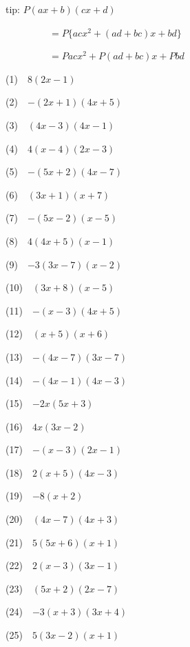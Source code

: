 \documentclass[a4j,twocolumn,10pt,fleqn]{jarticle}
\begin{document}
tip: $P(ax + b)(cx + d)$

~~~~~~~~~$= P\{acx^2 + (ad + bc)x +bd\}$

~~~~~~~~~$= Pacx^2 + P(ad + bc)x + Pbd$

(1)~~$8(2x-1)$

(2)~~$-(2x+1)(4x+5)$

(3)~~$(4x-3)(4x-1)$

(4)~~$4(x-4)(2x-3)$

(5)~~$-(5x+2)(4x-7)$

(6)~~$(3x+1)(x+7)$

(7)~~$-(5x-2)(x-5)$

(8)~~$4(4x+5)(x-1)$

(9)~~$-3(3x-7)(x-2)$

(10)~~$(3x+8)(x-5)$

(11)~~$-(x-3)(4x+5)$

(12)~~$(x+5)(x+6)$

(13)~~$-(4x-7)(3x-7)$

(14)~~$-(4x-1)(4x-3)$

(15)~~$-2x(5x+3)$

(16)~~$4x(3x-2)$

(17)~~$-(x-3)(2x-1)$

(18)~~$2(x+5)(4x-3)$

(19)~~$-8(x+2)$

(20)~~$(4x-7)(4x+3)$

(21)~~$5(5x+6)(x+1)$

(22)~~$2(x-3)(3x-1)$

(23)~~$(5x+2)(2x-7)$

(24)~~$-3(x+3)(3x+4)$

(25)~~$5(3x-2)(x+1)$
\end{document}
